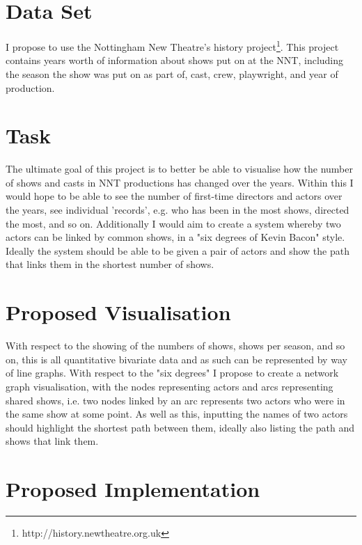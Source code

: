 \documentclass[12pt]{article}
\begin{document}
\maketitle
\tableofcontents
\pagebreak

\section{Data Set}
I propose to use the Nottingham New Theatre's history project\footnote{http://history.newtheatre.org.uk}. 
This project contains years worth of information about shows put on at the NNT, including the season the show was put on as part of, cast, crew, playwright, and year of production. 

\section{Task}
The ultimate goal of this project is to better be able to visualise how the number of shows and casts in NNT productions has changed over the years. 
Within this I would hope to be able to see the number of first-time directors and actors over the years, see individual 'records', e.g. who has been in the most shows, directed the most, and so on. 
Additionally I would aim to create a system whereby two actors can be linked by common shows, in a "six degrees of Kevin Bacon" style. 
Ideally the system should be able to be given a pair of actors and show the path that links them in the shortest number of shows.

\section{Proposed Visualisation}
With respect to the showing of the numbers of shows, shows per season, and so on, this is all quantitative bivariate data and as such can be represented by way of line graphs. 
With respect to the "six degrees" I propose to create a network graph visualisation, with the nodes representing actors and arcs representing shared shows, i.e. two nodes linked by an arc represents two actors who were in the same show at some point. 
As well as this, inputting the names of two actors should highlight the shortest path between them, ideally also listing the path and shows that link them.

\section{Proposed Implementation}
\end{document}
